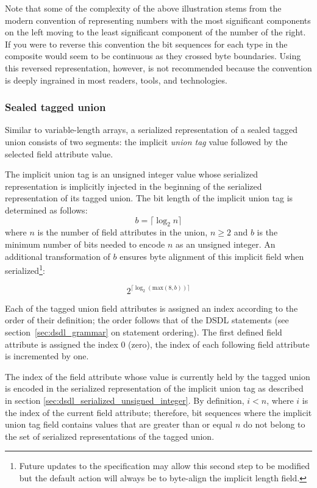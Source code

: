 \begin{remark}
    Note that some of the complexity of the above illustration stems from the modern convention of representing
    numbers with the most significant components on the left moving to the least significant component of the
    number of the right. If you were to reverse this convention the bit sequences for each type in the composite
    would seem to be continuous as they crossed byte boundaries. Using this reversed representation, however, is
    not recommended because the convention is deeply ingrained in most readers, tools, and technologies.
\end{remark}

\subsubsection{Sealed tagged union}

Similar to variable-length arrays, a serialized representation of a sealed tagged union consists of two segments:
the implicit \emph{union tag} value followed by the selected field attribute value.

The implicit union tag is an unsigned integer value whose serialized representation
is implicitly injected in the beginning of the serialized representation of its tagged union.
The bit length of the implicit union tag is determined as follows:
$$b=\lceil{}\log_2 n\rceil{}$$
where $n$ is the number of field attributes in the union, $n \geq 2$ and $b$ is the minimum number of bits needed
to encode $n$ as an unsigned integer. An additional transformation of $b$ ensures byte alignment of this implicit
field when serialized\footnote{Future updates to the specification may allow this second step to be modified but
the default action will always be to byte-align the implicit length field.}:

$$2^{\lceil{}\log_2 (\text{max}(8, b))\rceil{}}$$

Each of the tagged union field attributes is assigned an index according to the order of their definition;
the order follows that of the DSDL statements (see section~\ref{sec:dsdl_grammar} on statement ordering).
The first defined field attribute is assigned the index 0 (zero),
the index of each following field attribute is incremented by one.

The index of the field attribute whose value is currently held by the tagged union is encoded
in the serialized representation of the implicit union tag as described in section
\ref{sec:dsdl_serialized_unsigned_integer}.
By definition, $i < n$, where $i$ is the index of the current field attribute;
therefore, bit sequences where the implicit union tag field contains values
that are greater than or equal $n$ do not belong to the set of serialized representations of the tagged union.

